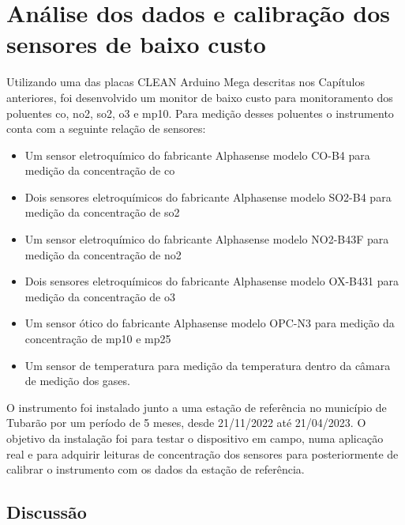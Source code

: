 \chapter{Análise dos dados e calibração dos sensores de baixo custo}\label{cap:field-monit-results}

Utilizando uma das placas CLEAN Arduino Mega descritas nos Capítulos anteriores, foi desenvolvido um monitor de baixo custo para monitoramento dos poluentes \acrshort{co}, \acrshort{no2}, \acrshort{so2}, \acrshort{o3} e \acrshort{mp10}. Para medição desses poluentes o instrumento conta com a seguinte relação de sensores:

\begin{itemize}
    \item Um sensor eletroquímico do fabricante Alphasense modelo CO-B4 para medição da concentração de \acrshort{co}
    \item Dois sensores eletroquímicos do fabricante Alphasense modelo SO2-B4 para medição da concentração de \acrshort{so2}
    \item Um sensor eletroquímico do fabricante Alphasense modelo NO2-B43F para medição da concentração de \acrshort{no2}
    \item Dois sensores eletroquímicos do fabricante Alphasense modelo OX-B431 para medição da concentração de \acrshort{o3}
    \item Um sensor ótico do fabricante Alphasense modelo OPC-N3 para medição da concentração de \acrshort{mp10} e \acrshort{mp25}
    \item Um sensor de temperatura para medição da temperatura dentro da câmara de medição dos gases.
\end{itemize}

O instrumento foi instalado junto a uma estação de referência no município de Tubarão por um período de 5 meses, desde 21/11/2022 até 21/04/2023. O objetivo da instalação foi para testar o dispositivo em campo, numa aplicação real e para adquirir leituras de concentração dos sensores para posteriormente de calibrar o instrumento com os dados da estação de referência.













\section{Discussão}